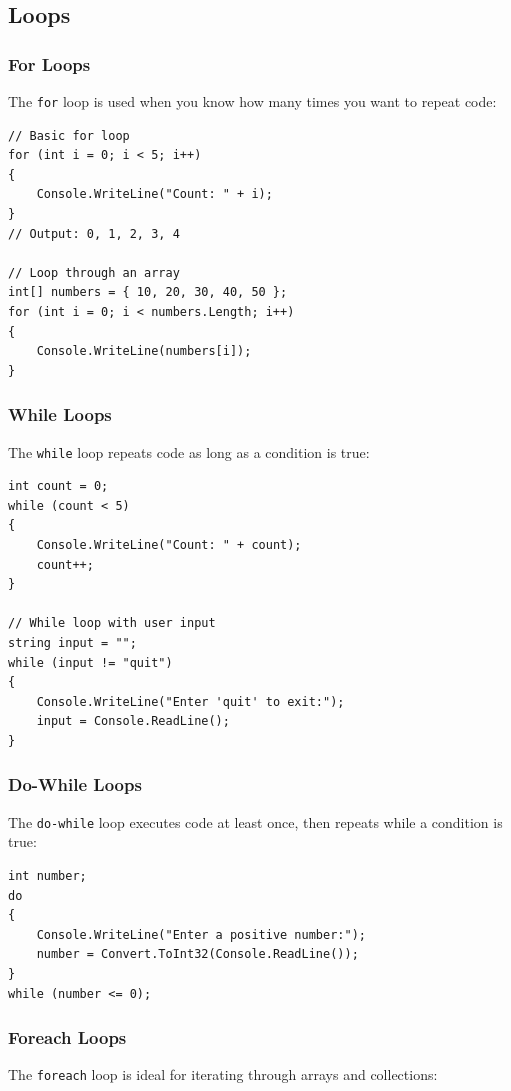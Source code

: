 \documentclass{article}
\begin{document}
\subsection{Loops}

\subsubsection{For Loops}
The \texttt{for} loop is used when you know how many times you want to repeat code:

\begin{verbatim}
// Basic for loop
for (int i = 0; i < 5; i++)
{
    Console.WriteLine("Count: " + i);
}
// Output: 0, 1, 2, 3, 4

// Loop through an array
int[] numbers = { 10, 20, 30, 40, 50 };
for (int i = 0; i < numbers.Length; i++)
{
    Console.WriteLine(numbers[i]);
}
\end{verbatim}

\subsubsection{While Loops}
The \texttt{while} loop repeats code as long as a condition is true:

\begin{verbatim}
int count = 0;
while (count < 5)
{
    Console.WriteLine("Count: " + count);
    count++;
}

// While loop with user input
string input = "";
while (input != "quit")
{
    Console.WriteLine("Enter 'quit' to exit:");
    input = Console.ReadLine();
}
\end{verbatim}

\subsubsection{Do-While Loops}
The \texttt{do-while} loop executes code at least once, then repeats while a condition is true:

\begin{verbatim}
int number;
do
{
    Console.WriteLine("Enter a positive number:");
    number = Convert.ToInt32(Console.ReadLine());
}
while (number <= 0);
\end{verbatim}

\subsubsection{Foreach Loops}
The \texttt{foreach} loop is ideal for iterating through arrays and collections:
\end{document}

